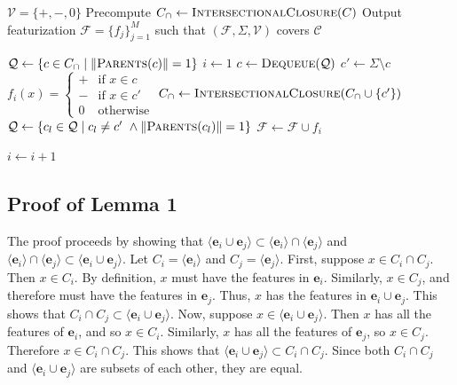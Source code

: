 \documentclass[11pt, oneside]{article}   	%
\begin{document}
\vspace{\baselineskip} \noindent \begin{algorithmic}
	\REQUIRE $\mathcal V = \{ +, -, 0 \}$
	\REQUIRE Precompute $C_\cap \leftarrow \textsc{IntersectionalClosure}(C)$
	\ENSURE Output featurization $\mathcal F = \{ f_j \}_{j=1}^M$ such that $(\mathcal F, \Sigma, \mathcal V)$ covers $\mathcal C$
	
	\STATE
	\STATE $\mathcal Q \leftarrow \{c \in C_\cap \mid \Vert\textsc{Parents}(c)\Vert = 1 \}$
	\STATE $i \leftarrow 1$
	\STATE
	\STATE $c \leftarrow \textsc{Dequeue}(\mathcal Q)$
	\STATE $c' \leftarrow \Sigma \setminus c$
	\STATE $f_i(x) = \begin{cases}
	+ & \mbox{if } x \in c \\
	- & \mbox{if } x \in c' \\
	0 & \mbox{otherwise}
	\end{cases} $
	\STATE $C_\cap \leftarrow \textsc{IntersectionalClosure}(C_\cap \cup \{c'\})$
	\STATE $\mathcal Q \leftarrow \{c_l \in \mathcal Q \mid c_l \not= c' \ \land \Vert \textsc{Parents}(c_l) \Vert = 1 \}$
	\STATE $\mathcal F \leftarrow \mathcal F \cup f_i$
	
	\STATE $i \leftarrow i + 1$
	\ENDWHILE
\end{algorithmic}

\appendix

\subsection{Proof of Lemma 1}

The proof proceeds by showing that $\langle \mathbf{e}_i \cup \mathbf{e}_j \rangle \subset  \langle \mathbf{e}_i \rangle \cap \langle \mathbf{e}_j \rangle$ and $ \langle \mathbf{e}_i \rangle \cap \langle \mathbf{e}_j \rangle \subset \langle \mathbf{e}_i \cup \mathbf{e}_j \rangle$.
Let $C_i = \langle \mathbf{e}_i \rangle$ and $C_j = \langle \mathbf{e}_j \rangle$.
First, suppose $x \in C_i \cap C_j$. Then $x \in C_i$. By definition, $x$ must have the features in $\mathbf{e}_i$.
Similarly, $x \in C_j$, and therefore must have the features in $\mathbf{e}_j$.
Thus, $x$ has the features in $\mathbf{e}_i \cup \mathbf{e}_j$. This shows that $C_i \cap C_j \subset \langle \mathbf{e}_i \cup \mathbf{e}_j \rangle$.
Now, suppose $x \in \langle \mathbf{e}_i \cup \mathbf{e}_j \rangle$. Then $x$ has all the features of $\mathbf{e}_i$, and so $x \in C_i$.
Similarly, $x$ has all the features of $\mathbf{e}_j$, so $x \in C_j$. Therefore $x \in C_i \cap C_j$. This shows that $\langle \mathbf{e}_i \cup \mathbf{e}_j \rangle \subset C_i \cap C_j$.
Since both $C_i \cap C_j$ and $\langle \mathbf{e}_i \cup \mathbf{e}_j \rangle$ are subsets of each other, they are equal.
\end{document}
